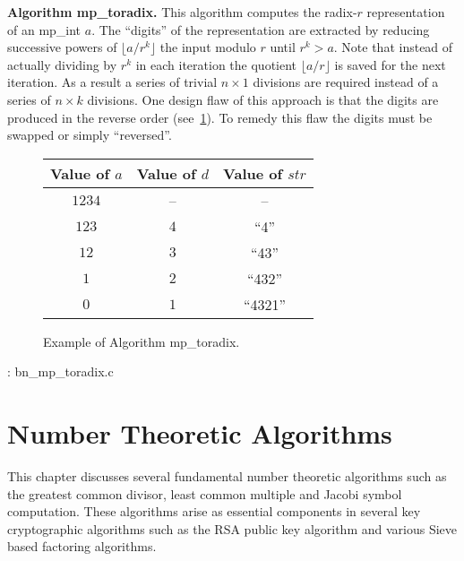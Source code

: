 \documentclass[b5paper]{book}
\begin{document}
\textbf{Algorithm mp\_toradix.}
This algorithm computes the radix-$r$ representation of an mp\_int $a$.  The ``digits'' of the representation are extracted by reducing 
successive powers of $\lfloor a / r^k \rfloor$ the input modulo $r$ until $r^k > a$.  Note that instead of actually dividing by $r^k$ in
each iteration the quotient $\lfloor a / r \rfloor$ is saved for the next iteration.  As a result a series of trivial $n \times 1$ divisions
are required instead of a series of $n \times k$ divisions.  One design flaw of this approach is that the digits are produced in the reverse order 
(see~\ref{fig:mpradix}).  To remedy this flaw the digits must be swapped or simply ``reversed''.

\begin{figure}
\begin{center}
\begin{tabular}{|c|c|c|}
\hline \textbf{Value of $a$} & \textbf{Value of $d$} & \textbf{Value of $str$} \\
\hline $1234$ & -- & -- \\
\hline $123$  & $4$ & ``4'' \\
\hline $12$   & $3$ & ``43'' \\
\hline $1$    & $2$ & ``432'' \\
\hline $0$    & $1$ & ``4321'' \\
\hline
\end{tabular}
\end{center}
\caption{Example of Algorithm mp\_toradix.}
\label{fig:mpradix}
\end{figure}

\vspace{+3mm}\begin{small}
\hspace{-5.1mm}{\bf File}: bn\_mp\_toradix.c
\vspace{-3mm}
\begin{alltt}
\end{alltt}
\end{small}

\chapter{Number Theoretic Algorithms}
This chapter discusses several fundamental number theoretic algorithms such as the greatest common divisor, least common multiple and Jacobi 
symbol computation.  These algorithms arise as essential components in several key cryptographic algorithms such as the RSA public key algorithm and
various Sieve based factoring algorithms.
\end{document}

